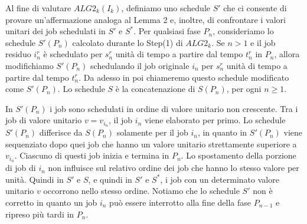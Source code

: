 \documentclass[twoside,openany,titlepage,fleqn,
	headinclude,12pt,a4paper,BCOR5mm,footinclude]{scrbook}
\begin{document}
Al fine di valutare $ALG2_{k}(I_{k})$, definiamo uno schedule $S'$ che ci consente di provare un'affermazione analoga al Lemma 2 e, inoltre, di confrontare i valori unitari dei job schedulati in $S'$ e $S^{*}$. Per qualsiasi fase $P_{n}$, consideriamo lo schedule $S'(P_{n})$ calcolato durante lo Step(1) di $ALG2_{k}$. Se $n > 1$ e il job residuo $i^{r}_{n}$ è schedulato per $s^{r}_{n}$ unità di tempo a partire dal tempo $t^{r}_{n}$ in $P_{n}$, allora modifichiamo $S'(P_{n})$ schedulando il job originale $i_{n}$ per $s^{r}_{n}$ unità di tempo a partire dal tempo $t^{r}_{n}$. Da adesso in poi chiameremo questo schedule modificato come $S'(P_{n})$. Lo schedule $S$ è la concatenazione di $S(P_{n})$, per ogni $n \geq 1$.

In $S'(P_{n})$ i job sono schedulati in ordine di valore unitario non crescente. Tra i job di valore unitario $v = v_{i_{n}}$, il job $i_{n}$ viene elaborato per primo. Lo schedule $S'(P_{n})$ differisce da $S(P_{n})$ solamente per il job $i_{n}$, in quanto in $S'(P_{n})$ viene sequenziato dopo quei job che hanno un valore unitario strettamente superiore a $v_{i_{n}}$. Ciascuno di questi job inizia e termina in $P_{n}$. Lo spostamento della porzione di job di $i_{n}$ non influisce sul relativo ordine dei job che hanno lo stesso valore per unità. Quindi in $S'$ e $S$, e quindi in $S'$ e $S^{*}$, i job con un determinato valore unitario $v$ occorrono nello stesso ordine. Notiamo che lo schedule $S'$ non è corretto in quanto un job $i_{n}$ può essere interrotto alla fine della fase $P_{n-1}$ e ripreso più tardi in $P_{n}$.
\end{document}
